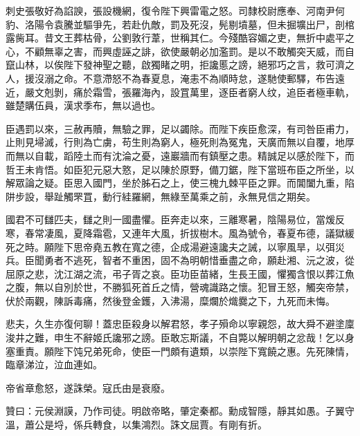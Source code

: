 \begin{pinyinscope}
刺史張敬好為諂諛，張設機網，復令陛下興雷電之怒。司隸校尉應奉、河南尹何豹、洛陽令袁騰並驅爭先，若赴仇敵，罰及死沒，髡剔墳墓，但未掘壙出尸，剖棺露胔耳。昔文王葬枯骨，公劉敦行葦，世稱其仁。今殘酷容媚之吏，無折中處平之心，不顧無辜之害，而興虛誣之誹，欲使嚴朝必加濫罰。是以不敢觸突天威，而自竄山林，以俟陛下發神聖之聽，啟獨睹之明，拒讒慝之謗，絕邪巧之言，救可濟之人，援沒溺之命。不意滯怒不為春夏息，淹恚不為順時怠，遂馳使郵驛，布告遠近，嚴文剋剝，痛於霜雪，張羅海內，設罝萬里，逐臣者窮人纹，追臣者極車軌，雖楚購伍員，漢求季布，無以過也。

臣遇罰以來，三赦再贖，無驗之罪，足以蠲除。而陛下疾臣愈深，有司咎臣甫力，止則見埽滅，行則為亡虜，苟生則為窮人，極死則為冤鬼，天廣而無以自覆，地厚而無以自載，蹈陸土而有沈淪之憂，遠巖牆而有鎮壓之患。精誠足以感於陛下，而哲王未肯悟。如臣犯元惡大憝，足以陳於原野，備刀鋸，陛下當班布臣之所坐，以解眾論之疑。臣思入國門，坐於胏石之上，使三槐九棘平臣之罪。而閶闔九重，陷阱步設，舉趾觸罘罝，動行絓羅網，無綠至萬乘之前，永無見信之期矣。

國君不可讎匹夫，讎之則一國盡懼。臣奔走以來，三離寒暑，陰陽易位，當煖反寒，春常凄風，夏降霜雹，又連年大風，折拔樹木。風為號令，春夏布德，議獄緩死之時。願陛下思帝堯五教在寬之德，企成湯避遠讒夫之誡，以寧風旱，以弭災兵。臣聞勇者不逃死，智者不重困，固不為明朝惜垂盡之命，願赴湘、沅之波，從屈原之悲，沈江湖之流，弔子胥之哀。臣功臣苗緒，生長王國，懼獨含恨以葬江魚之腹，無以自別於世，不勝狐死首丘之情，營魂識路之懷。犯冒王怒，觸突帝禁，伏於兩觀，陳訴毒痛，然後登金鑊，入沸湯，糜爛於熾爨之下，九死而未悔。

悲夫，久生亦復何聊！蓋忠臣殺身以解君怒，孝子殞命以寧親怨，故大舜不避塗廩浚井之難，申生不辭姬氏讒邪之謗。臣敢忘斯議，不自斃以解明朝之忿哉！乞以身塞重責。願陛下饨兄弟死命，使臣一門頗有遺類，以崇陛下寬饒之惠。先死陳情，臨章涕泣，泣血連如。

帝省章愈怒，遂誅榮。寇氏由是衰廢。

贊曰：元侯淵謨，乃作司徒。明啟帝略，肇定秦都。勳成智隱，靜其如愚。子翼守溫，蕭公是埒，係兵轉食，以集鴻烈。誅文屈賈。有剛有折。


\end{pinyinscope}